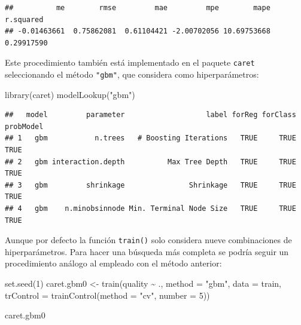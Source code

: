 \documentclass[
  spanish,
]{book}
\newenvironment{Shaded}{\begin{snugshade}}{\end{snugshade}}
\newcommand{\AttributeTok}[1]{\textcolor[rgb]{0.77,0.63,0.00}{#1}}
\newcommand{\DecValTok}[1]{\textcolor[rgb]{0.00,0.00,0.81}{#1}}
\newcommand{\FunctionTok}[1]{\textcolor[rgb]{0.00,0.00,0.00}{#1}}
\newcommand{\NormalTok}[1]{#1}
\newcommand{\OtherTok}[1]{\textcolor[rgb]{0.56,0.35,0.01}{#1}}
\newcommand{\SpecialCharTok}[1]{\textcolor[rgb]{0.00,0.00,0.00}{#1}}
\newcommand{\StringTok}[1]{\textcolor[rgb]{0.31,0.60,0.02}{#1}}
\theoremstyle{break}
\theoremstyle{definition}
\theoremstyle{definition}
\theoremstyle{definition}
\theoremstyle{definition}
\theoremstyle{remark}
\begin{document}
\begin{verbatim}
##          me        rmse         mae         mpe        mape   r.squared 
## -0.01463661  0.75862081  0.61104421 -2.00702056 10.69753668  0.29917590
\end{verbatim}

Este procedimiento también está implementado en el paquete \texttt{caret} seleccionando el método \texttt{"gbm"}, que considera como hiperparámetros:

\begin{Shaded}
\begin{Highlighting}[]
\FunctionTok{library}\NormalTok{(caret)}
\FunctionTok{modelLookup}\NormalTok{(}\StringTok{"gbm"}\NormalTok{)}
\end{Highlighting}
\end{Shaded}

\begin{verbatim}
##   model         parameter                   label forReg forClass probModel
## 1   gbm           n.trees   # Boosting Iterations   TRUE     TRUE      TRUE
## 2   gbm interaction.depth          Max Tree Depth   TRUE     TRUE      TRUE
## 3   gbm         shrinkage               Shrinkage   TRUE     TRUE      TRUE
## 4   gbm    n.minobsinnode Min. Terminal Node Size   TRUE     TRUE      TRUE
\end{verbatim}

Aunque por defecto la función \texttt{train()} solo considera nueve combinaciones de hiperparámetros. Para hacer una búsqueda más completa se podría seguir un procedimiento análogo al empleado con el método anterior:

\begin{Shaded}
\begin{Highlighting}[]
\FunctionTok{set.seed}\NormalTok{(}\DecValTok{1}\NormalTok{)}
\NormalTok{caret.gbm0 }\OtherTok{\textless{}{-}} \FunctionTok{train}\NormalTok{(quality }\SpecialCharTok{\textasciitilde{}}\NormalTok{ ., }\AttributeTok{method =} \StringTok{"gbm"}\NormalTok{, }\AttributeTok{data =}\NormalTok{ train,}
                   \AttributeTok{trControl =} \FunctionTok{trainControl}\NormalTok{(}\AttributeTok{method =} \StringTok{"cv"}\NormalTok{, }\AttributeTok{number =} \DecValTok{5}\NormalTok{))}
\end{Highlighting}
\end{Shaded}

\begin{Shaded}
\begin{Highlighting}[]
\NormalTok{caret.gbm0}
\end{Highlighting}
\end{Shaded}
\end{document}
